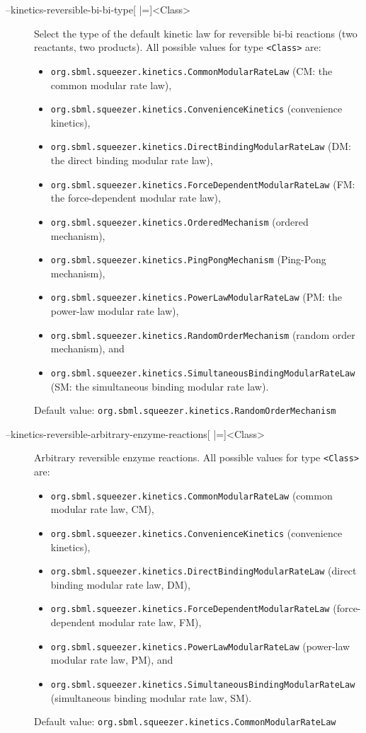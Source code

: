 \begin{description}
\item[--kinetics-reversible-bi-bi-type{[} |={]}<Class>]
  Select the type of the default kinetic law for reversible bi-bi
  reactions (two reactants, two products).
  All possible values for type \texttt{<Class>} are:
  \begin{itemize}
  \item\texttt{org.sbml.squeezer.kinetics.CommonModularRateLaw} (CM: the common modular rate law),
  \item\texttt{org.sbml.squeezer.kinetics.ConvenienceKinetics} (convenience kinetics),
  \item\texttt{org.sbml.squeezer.kinetics.DirectBindingModularRateLaw} (DM: the direct binding modular rate law),
  \item\texttt{org.sbml.squeezer.kinetics.ForceDependentModularRateLaw} (FM: the force-dependent modular rate law),
  \item\texttt{org.sbml.squeezer.kinetics.OrderedMechanism} (ordered mechanism),
  \item\texttt{org.sbml.squeezer.kinetics.PingPongMechanism} (Ping-Pong mechanism),
  \item\texttt{org.sbml.squeezer.kinetics.PowerLawModularRateLaw} (PM: the power-law modular rate law),
  \item\texttt{org.sbml.squeezer.kinetics.RandomOrderMechanism} (random order mechanism), and
  \item\texttt{org.sbml.squeezer.kinetics.SimultaneousBindingModularRateLaw} (SM: the simultaneous binding modular rate law).
  \end{itemize}
  Default value: \texttt{org.sbml.squeezer.kinetics.RandomOrderMechanism}

\item[--kinetics-reversible-arbitrary-enzyme-reactions{[} |={]}<Class>]
  Arbitrary reversible enzyme reactions.
  All possible values for type \texttt{<Class>} are:
  \begin{itemize}
  \item\texttt{org.sbml.squeezer.kinetics.CommonModularRateLaw} (common modular rate law, CM),
  \item\texttt{org.sbml.squeezer.kinetics.ConvenienceKinetics} (convenience kinetics),
  \item\texttt{org.sbml.squeezer.kinetics.DirectBindingModularRateLaw} (direct binding modular rate law, DM),
  \item\texttt{org.sbml.squeezer.kinetics.ForceDependentModularRateLaw} (force-dependent modular rate law, FM),
  \item\texttt{org.sbml.squeezer.kinetics.PowerLawModularRateLaw} (power-law modular rate law, PM), and
  \item\texttt{org.sbml.squeezer.kinetics.SimultaneousBindingModularRateLaw} (simultaneous binding modular rate law, SM).
  \end{itemize}
  Default value: \texttt{org.sbml.squeezer.kinetics.CommonModularRateLaw}
\end{description}

